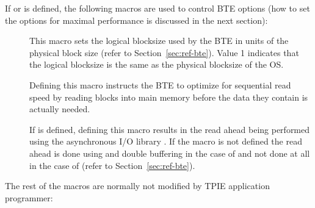 \noindent
If  or  is defined, the following macros
are used to control BTE options (how to set the options for maximal
performance is discussed in the next section):

  \begin{description}

  \item[{}] This macro sets the
  logical blocksize used by the BTE in units of the physical block size
  (refer to Section~\ref{sec:ref-bte}). Value 1 indicates that the logical
  blocksize is the same as the physical blocksize of the OS.

  \item[{}] Defining this macro instructs the
  BTE to optimize for sequential read speed by reading blocks into main
  memory before the data they contain is actually needed.

  
  \item[{}] If  is defined,
  defining this macro results in the read ahead being performed using the
  asynchronous I/O library . If the macro {}
  is not defined the read ahead is done using  and double
  buffering in the case of  and not done at all in the
  case of  (refer to Section~\ref{sec:ref-bte}).

  \end{description}

\noindent
The rest of the macros are normally not modified by TPIE application
programmer:

